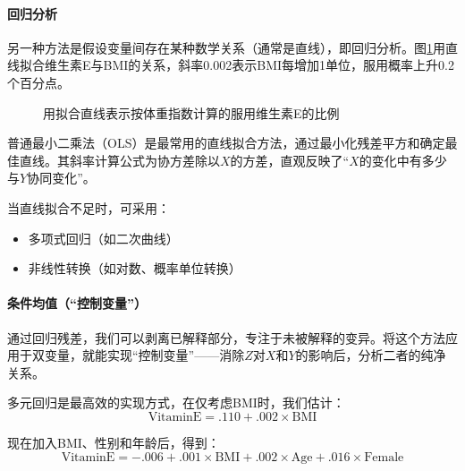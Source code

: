 \paragraph*{回归分析}

另一种方法是假设变量间存在某种数学关系（通常是直线），即回归分析。图\ref{fig:VitaminE_BMI_linear}用直线拟合维生素E与BMI的关系，斜率0.002表示BMI每增加1单位，服用概率上升0.2个百分点。

\begin{figure}[ht]
	\centering
	\caption{用拟合直线表示按体重指数计算的服用维生素E的比例}
	\label{fig:VitaminE_BMI_linear}
\end{figure}

普通最小二乘法（OLS）是最常用的直线拟合方法，通过最小化残差平方和确定最佳直线。其斜率计算公式为协方差除以$X$的方差，直观反映了``$X$的变化中有多少与$Y$协同变化''。

当直线拟合不足时，可采用：
\begin{itemize}
	\item 多项式回归（如二次曲线）
	\item 非线性转换（如对数、概率单位转换）
\end{itemize}

\paragraph*{条件均值（``控制变量''）}

通过回归残差，我们可以剥离已解释部分，专注于未被解释的变异。将这个方法应用于双变量，就能实现``控制变量''——消除$Z$对$X$和$Y$的影响后，分析二者的纯净关系。

多元回归是最高效的实现方式，在仅考虑BMI时，我们估计：
\begin{equation}
	\text{VitaminE} = .110 + .002 \times \text{BMI}
\end{equation}

现在加入BMI、性别和年龄后，得到：
\begin{equation}
	\text{VitaminE} = -.006 + .001 \times \text{BMI} + .002 \times \text{Age} + .016 \times \text{Female}
\end{equation}

